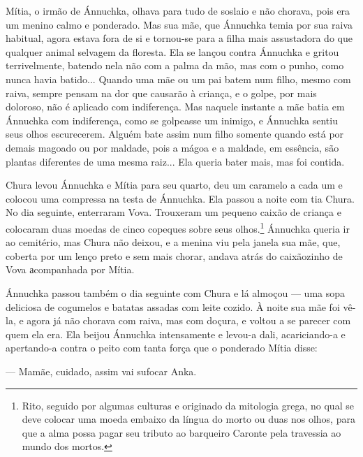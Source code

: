 Mítia, o irmão de Ánnuchka, olhava para tudo de soslaio e não chorava,
pois era um menino calmo e ponderado. Mas sua mãe, que Ánnuchka temia
por sua raiva habitual, agora estava fora de si e tornou-se para a filha
mais assustadora do que qualquer animal selvagem da floresta. Ela se
lançou contra Ánnuchka e gritou terrivelmente, batendo nela não com a
palma da mão, mas com o punho, como nunca havia batido... Quando uma mãe
ou um pai batem num filho, mesmo com raiva, sempre pensam na dor que
causarão à criança, e o golpe, por mais doloroso, não é aplicado com
indiferença. Mas naquele instante a mãe batia em Ánnuchka com
indiferença, como se golpeasse um inimigo, e Ánnuchka sentiu seus olhos
escurecerem. Alguém bate assim num filho somente quando está por demais
magoado ou por maldade, pois a mágoa e a maldade, em essência, são
plantas diferentes de uma mesma raiz... Ela queria bater mais, mas foi
contida.

Chura levou Ánnuchka e Mítia para seu quarto, deu um caramelo a cada um
e colocou uma compressa na testa de Ánnuchka. Ela passou a noite com tia
Chura. No dia seguinte, enterraram Vova. Trouxeram um pequeno caixão de
criança e colocaram duas moedas de cinco copeques sobre seus
olhos.\footnote{Rito, seguido por algumas culturas e originado da
  mitologia grega, no qual se deve colocar uma moeda embaixo da língua
  do morto ou duas nos olhos, para que a alma possa pagar seu tributo ao
  barqueiro Caronte pela travessia ao mundo dos mortos.} Ánnuchka queria
ir ao cemitério, mas Chura não deixou, e a menina viu pela janela sua
mãe, que, coberta por um lenço preto e sem mais chorar, andava atrás do
caixãozinho de Vova аcompanhada por Mítia.

Ánnuchka passou também o dia seguinte com Chura e lá almoçou --- uma
sopa deliciosa de cogumelos e batatas assadas com leite cozido. À noite
sua mãe foi vê-la, e agora já não chorava com raiva, mas com doçura, e
voltou a se parecer com quem ela era. Ela beijou Ánnuchka intensamente e
levou-a dali, acariciando-a e apertando-a contra o peito com tanta força
que o ponderado Mítia disse:

--- Mamãe, cuidado, assim vai sufocar Anka.

